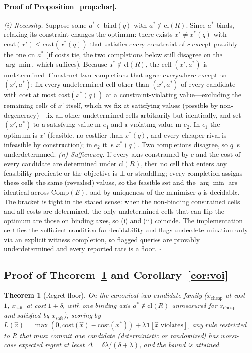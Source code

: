 \documentclass{article} %
\newtheorem{theorem}{Theorem}
\newcommand{\bind}{\mathrm{bind}}
\newcommand{\cl}{\mathrm{cl}}
\newcommand{\Comp}{\mathrm{Comp}}
\newcommand{\bbot}{\bot}
\begin{document}
\paragraph{Proof of Proposition~\ref{prop:char}.}
\emph{(i) Necessity.} Suppose some $a^* \in \bind(q)$ with $a^* \notin \cl(R)$. Since $a^*$ binds, relaxing its constraint changes the optimum: there exists $x' \neq x^*(q)$ with $\mathrm{cost}(x') \le \mathrm{cost}(x^*(q))$ that satisfies every constraint of $c$ except possibly the one on $a^*$ (if costs tie, the two completions below still disagree on the $\arg\min$, which suffices). Because $a^* \notin \cl(R)$, the cell $(x', a^*)$ is undetermined. Construct two completions that agree everywhere except on $(x', a^*)$: fix every undetermined cell other than $(x', a^*)$ of every candidate with cost at most $\mathrm{cost}(x^*(q))$ at a constraint-violating value---excluding the remaining cells of $x'$ itself, which we fix at satisfying values (possible by non-degeneracy)---fix all other undetermined cells arbitrarily but identically, and set $(x', a^*)$ to a satisfying value in $e_1$ and a violating value in $e_2$. In $e_1$ the optimum is $x'$ (feasible, no costlier than $x^*(q)$, and every cheaper rival is infeasible by construction); in $e_2$ it is $x^*(q)$. Two completions disagree, so $q$ is underdetermined.
\emph{(ii) Sufficiency.} If every axis constrained by $c$ and the cost of every candidate are determined under $\cl(R)$, then no cell that enters any feasibility predicate or the objective is $\bbot$ or straddling; every completion assigns these cells the same (revealed) values, so the feasible set and the $\arg\min$ are identical across $\Comp(E)$, and by uniqueness of the minimizer $q$ is decidable.
The bracket is tight in the stated sense: when the non-binding constrained cells and all costs are determined, the only undetermined cells that can flip the optimum are those on binding axes, so (i) and (ii) coincide. The implementation certifies the sufficient condition for decidability and flags underdetermination only via an explicit witness completion, so flagged queries are provably underdetermined and every reported rate is a floor. \hfill$\square$

\subsection{Proof of Theorem~\ref{thm:floor} and Corollary~\ref{cor:voi}}

\begin{theorem}[Regret floor]
\label{thm:floor}
On the canonical two-candidate family ($x_{\mathrm{cheap}}$ at cost $1$, $x_{\mathrm{safe}}$ at cost $1{+}\delta$, with one binding axis $a^*\notin\cl(R)$ unmeasured for $x_{\mathrm{cheap}}$ and satisfied by $x_{\mathrm{safe}}$), scoring by $L(\hat{x}) = \max(0, \mathrm{cost}(\hat{x}) - \mathrm{cost}(x^*)) + \lambda \mathbf{1}[\hat{x}\text{ violates}]$, any rule restricted to $R$ that must commit one candidate (deterministic or randomized) has worst-case expected regret at least $\Delta = \delta\lambda/(\delta+\lambda)$, and the bound is attained.
\end{theorem}
\end{document}
